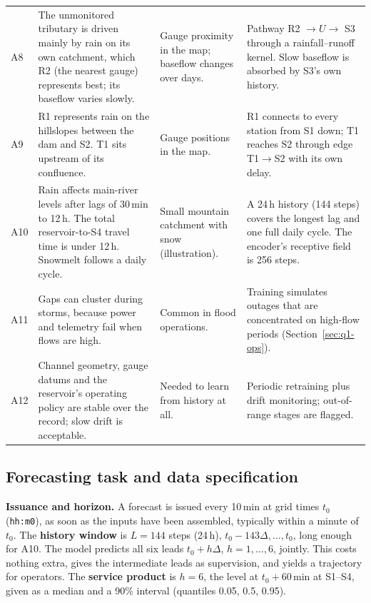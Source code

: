 {\begin{longtable}{@{}p{}p{}p{}p{}@{}}
A8 & The unmonitored tributary is driven mainly by rain on its own catchment, which R2 (the nearest gauge) represents best; its baseflow varies slowly. & Gauge proximity in the map; baseflow changes over days. & Pathway R2 $\to U\to$ S3 through a rainfall--runoff kernel. Slow baseflow is absorbed by S3's own history. \\
A9 & R1 represents rain on the hillslopes between the dam and S2. T1 sits upstream of its confluence. & Gauge positions in the map. & R1 connects to every station from S1 down; T1 reaches S2 through edge T1$\to$S2 with its own delay. \\
A10 & Rain affects main-river levels after lags of 30\,min to 12\,h. The total reservoir-to-S4 travel time is under 12\,h. Snowmelt follows a daily cycle. & Small mountain catchment with snow (illustration). & A 24\,h history (144 steps) covers the longest lag and one full daily cycle. The encoder's receptive field is 256 steps. \\
A11 & Gaps can cluster during storms, because power and telemetry fail when flows are high. & Common in flood operations. & Training simulates outages that are concentrated on high-flow periods (Section~\ref{sec:q1-ops}). \\
A12 & Channel geometry, gauge datums and the reservoir's operating policy are stable over the record; slow drift is acceptable. & Needed to learn from history at all. & Periodic retraining plus drift monitoring; out-of-range stages are flagged. \\
\bottomrule
\end{longtable}
}

\subsection{Forecasting task and data specification}
\label{sec:q1-task}

\textbf{Issuance and horizon.} A forecast is issued every 10\,min at grid times $t_0$ (\texttt{hh:m0}), as soon
as the inputs have been assembled, typically within a minute of $t_0$. The \textbf{history window} is $L=144$
steps (24\,h), $t_0-143\Delta,\dots,t_0$, long enough for A10. The model predicts all six leads
$t_0+h\Delta$, $h=1,\dots,6$, jointly. This costs nothing extra, gives the intermediate leads as
supervision, and yields a trajectory for operators. The \textbf{service product} is $h=6$, the level at
$t_0+60$\,min at S1--S4, given as a median and a 90\% interval (quantiles 0.05, 0.5, 0.95).

